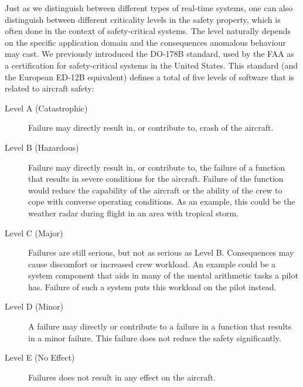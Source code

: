 Just as we distinguish between different types of real-time systems, one can also distinguish between different criticality levels in the safety property, which is often done in the context of safety-critical systems. The level naturally depends on the specific application domain and the consequences anomalous behaviour may cast. We previously introduced the DO-178B standard, used by the FAA as a certification for safety-critical systems in the United States. This standard (and the European ED-12B equivalent) defines a total of five levels of software that is related to aircraft safety:
\begin{description}
	\item[Level A (Catastrophic)] Failure may directly result in, or contribute to, crash of the aircraft.  
	\item[Level B (Hazardous)] Failure may directly result in, or contribute to, the failure of a function that results in severe conditions for the aircraft. Failure of the function would reduce the capability of the aircraft or the ability of the crew to cope with converse operating conditions. As an example, this could be the weather radar during flight in an area with tropical storm.
	\item[Level C (Major)] Failures are still serious, but not as serious as Level B. Consequences may cause discomfort or increased crew workload. An example could be a system component that aids in many of the mental arithmetic tasks a pilot has. Failure of such a system puts this workload on the pilot instead.
	\item[Level D (Minor)] A failure may directly or contribute to a failure in a function that results in a minor failure. This failure does not reduce the safety significantly.
	\item[Level E (No Effect)] Failures does not result in any effect on the aircraft.
\end{description}

